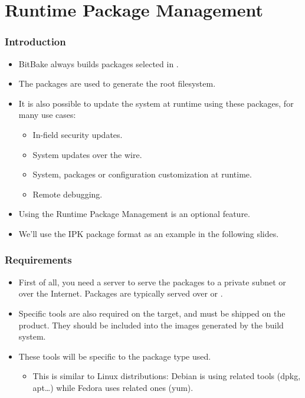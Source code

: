 \section{Runtime Package Management}

\begin{frame}
  \frametitle{Introduction}
  \begin{itemize}
    \item BitBake always builds packages selected in
      .
    \item The packages are used to generate the root filesystem.
    \item It is also possible to update the system at runtime using these
      packages, for many use cases:
      \begin{itemize}
        \item In-field security updates.
        \item System updates over the wire.
        \item System, packages or configuration customization at
          runtime.
        \item Remote debugging.
      \end{itemize}
    \item Using the Runtime Package Management is an optional feature.
    \item We'll use the IPK package format as an example in the
      following slides.
  \end{itemize}
\end{frame}

\begin{frame}
  \frametitle{Requirements}
  \begin{itemize}
    \item First of all, you need a server to serve the packages to a
      private subnet or over the Internet. Packages are typically
      served over  or .
    \item Specific tools are also required on the target, and must be
      shipped on the product. They should be included into the images
      generated by the build system.
    \item These tools will be specific to the package type used.
      \begin{itemize}
        \item This is similar to Linux distributions: Debian is using
           related tools (dpkg, apt\dots) while Fedora uses
           related ones (yum).
      \end{itemize}
  \end{itemize}
\end{frame}

